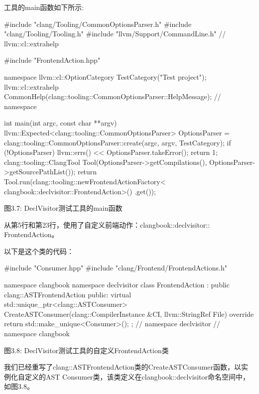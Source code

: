 工具的main函数如下所示:

\begin{cpp}
#include "clang/Tooling/CommonOptionsParser.h"
#include "clang/Tooling/Tooling.h"
#include "llvm/Support/CommandLine.h" // llvm::cl::extrahelp

#include "FrontendAction.hpp"

namespace {
  llvm::cl::OptionCategory TestCategory("Test project");
  llvm::cl::extrahelp
    CommonHelp(clang::tooling::CommonOptionsParser::HelpMessage);
} // namespace

int main(int argc, const char **argv) {
  llvm::Expected<clang::tooling::CommonOptionsParser> OptionsParser =
    clang::tooling::CommonOptionsParser::create(argc, argv, TestCategory);
  if (!OptionsParser) {
    llvm::errs() << OptionsParser.takeError();
    return 1;
  }
  clang::tooling::ClangTool Tool(OptionsParser->getCompilations(),
                                 OptionsParser->getSourcePathList());
  return Tool.run(clang::tooling::newFrontendActionFactory<
                       clangbook::declvisitor::FrontendAction>()
                       .get());
}
\end{cpp}

\begin{center}
图3.7: DeclVisitor测试工具的main函数
\end{center}

从第5行和第23行，使用了自定义前端动作：clangbook::declvisitor:: FrontendAction。

以下是这个类的代码：

\begin{cpp}
#include "Consumer.hpp"
#include "clang/Frontend/FrontendActions.h"

namespace clangbook {
namespace declvisitor {
class FrontendAction : public clang::ASTFrontendAction {
public:
  virtual std::unique_ptr<clang::ASTConsumer>
  CreateASTConsumer(clang::CompilerInstance &CI,
                    llvm::StringRef File) override {
    return std::make_unique<Consumer>();
  }
};
} // namespace declvisitor
}// namespace clangbook
\end{cpp}

\begin{center}
 图3.8: DeclVisitor测试工具的自定义FrontendAction类
\end{center}

我们已经重写了clang::ASTFrontendAction类的CreateASTConsumer函数，以实例化自定义的AST Consumer类，该类定义在clangbook::declvisitor命名空间中，如图3.8。

